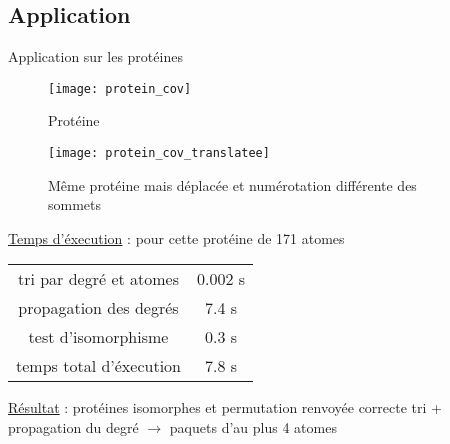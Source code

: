 \subsection{Application}
\begin{frame}{Application sur les protéines}
    \begin{multicols}{2}
        \begin{figure}[!htb]
            \centering
            \texttt{[image: protein\_cov]}
            \caption{\label{fig: Protéine}Protéine}
        \end{figure}
        \begin{center}
        \begin{figure}[!htb]
            \centering
            \texttt{[image: protein\_cov\_translatee]}
            \caption{\label{fig: Protéine translatée}Même protéine mais déplacée et numérotation différente des sommets}
        \end{figure}
    \end{center}
    \end{multicols}
    \underline{Temps d'éxecution} : pour cette protéine de 171 atomes
    \begin{center}
    \begin{tabular}{c|c}
        tri par degré et atomes & 0.002 s\\
        propagation des degrés & 7.4 s \\
        test d'isomorphisme & 0.3 s \\
        temps total d'éxecution & 7.8 s
    \end{tabular}
    \end{center}
    \underline{Résultat} : protéines isomorphes et permutation renvoyée correcte
    \newline tri + propagation du degré $\rightarrow$ paquets d'au plus 4 atomes
\end{frame}